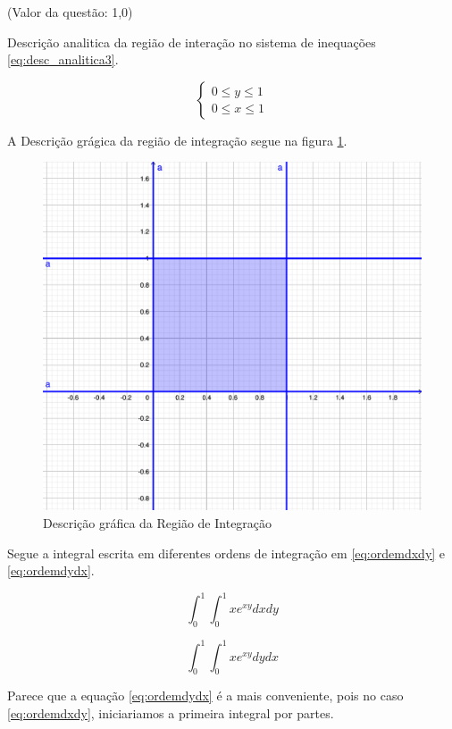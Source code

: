 \documentclass[10pt,a4paper]{article}
\begin{document}
	(Valor da questão: 1,0)

	Descrição analitica da região de interação no sistema de inequações \ref{eq:desc_analitica3}.
	
	\begin{equation} \label{eq:desc_analitica3}
		\left\{
			\begin{array}{l}
				0 \le y \le 1 \\
				0 \le x \le 1
			\end{array}
		\right.
	\end{equation}
	
	A Descrição grágica da região de integração segue na figura \ref{fig:integrais-multiplas-3a}.
	
	\begin{figure}[h]
		\centering
		\includegraphics[width=0.7\linewidth]{fig/integrais-multiplas-3a}
		\caption{Descrição gráfica da Região de Integração}
		\label{fig:integrais-multiplas-3a}
	\end{figure}

	Segue a integral escrita em diferentes ordens de integração em \ref{eq:ordemdxdy} e \ref{eq:ordemdydx}.

	\begin{equation} \label{eq:ordemdxdy}
		\int_0^1 \int_0^1 x e^{xy} dx dy
	\end{equation}
	
	\begin{equation} \label{eq:ordemdydx}
		\int_0^1 \int_0^1 x e^{xy} dy dx
	\end{equation}
	
	Parece que a equação \ref{eq:ordemdydx} é a mais conveniente, pois no caso \ref{eq:ordemdxdy}, iniciariamos a primeira integral por partes.
	
\end{document}
